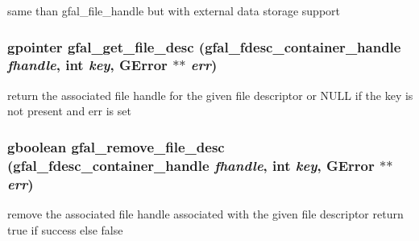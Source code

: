 same than gfal\_\-file\_\-handle but with external data storage support 
\subsubsection{\setlength{\rightskip}{0pt plus 5cm}gpointer gfal\_\-get\_\-file\_\-desc (gfal\_\-fdesc\_\-container\_\-handle {\em fhandle}, int {\em key}, GError $\ast$$\ast$ {\em err})}\label{gfal__common__filedescriptor_8c_91568ee8206643b36d685269b012eb45}


return the associated file handle for the given file descriptor or NULL if the key is not present and err is set 
\subsubsection{\setlength{\rightskip}{0pt plus 5cm}gboolean gfal\_\-remove\_\-file\_\-desc (gfal\_\-fdesc\_\-container\_\-handle {\em fhandle}, int {\em key}, GError $\ast$$\ast$ {\em err})}\label{gfal__common__filedescriptor_8c_4b10e1d3a5ffde849302fffdba207835}


remove the associated file handle associated with the given file descriptor return true if success else false 